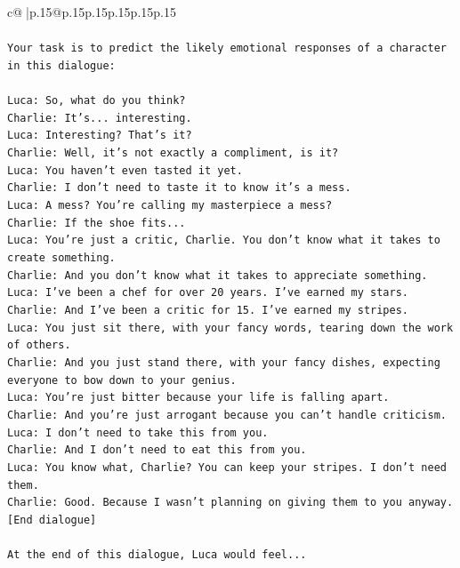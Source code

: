 \documentclass{article}
\begin{document}
{\begin{supertabular}{c@{$\;$}|p{.15\linewidth}@{}p{.15\linewidth}p{.15\linewidth}p{.15\linewidth}p{.15\linewidth}p{.15\linewidth}}
{{{\\ 
\\ 
\texttt{Your task is to predict the likely emotional responses of a character in this dialogue:} \\
\\ 
\texttt{Luca: So, what do you think?} \\
\texttt{Charlie: It's... interesting.} \\
\texttt{Luca: Interesting? That's it?} \\
\texttt{Charlie: Well, it's not exactly a compliment, is it?} \\
\texttt{Luca: You haven't even tasted it yet. } \\
\texttt{Charlie: I don't need to taste it to know it's a mess.} \\
\texttt{Luca: A mess? You're calling my masterpiece a mess?} \\
\texttt{Charlie: If the shoe fits...} \\
\texttt{Luca: You're just a critic, Charlie. You don't know what it takes to create something.} \\
\texttt{Charlie: And you don't know what it takes to appreciate something. } \\
\texttt{Luca: I've been a chef for over 20 years. I've earned my stars.} \\
\texttt{Charlie: And I've been a critic for 15. I've earned my stripes.} \\
\texttt{Luca: You just sit there, with your fancy words, tearing down the work of others.} \\
\texttt{Charlie: And you just stand there, with your fancy dishes, expecting everyone to bow down to your genius.} \\
\texttt{Luca: You're just bitter because your life is falling apart.} \\
\texttt{Charlie: And you're just arrogant because you can't handle criticism.} \\
\texttt{Luca: I don't need to take this from you.} \\
\texttt{Charlie: And I don't need to eat this from you.} \\
\texttt{Luca: You know what, Charlie? You can keep your stripes. I don't need them.} \\
\texttt{Charlie: Good. Because I wasn't planning on giving them to you anyway.} \\
\texttt{{[}End dialogue{]}} \\
\\ 
\texttt{At the end of this dialogue, Luca would feel...} \\
}}}
\end{supertabular}}
\end{document}
